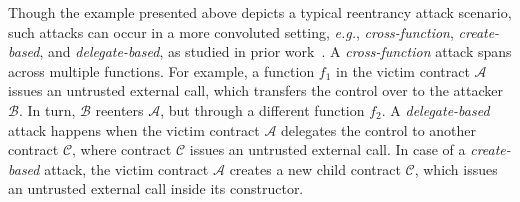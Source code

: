 \documentclass[conference, romanappendices]{tex/IEEEtran}
\theoremstyle{bfnote}
\newcommand{\reentrancy}{{reentrancy}\xspace}
\newcommand{\eg}{\textit{e.g.}}
\begin{document}
Though the example presented above depicts a typical \reentrancy attack scenario, such attacks can occur in a more convoluted setting, \eg, \textit{cross-function}, \textit{create-based}, and \textit{delegate-based}, as studied in prior work~\cite{sereum}.
A \textit{cross-function} attack spans across multiple functions.
For example, a function $f_1$ in the victim contract $\mathcal{A}$ issues an untrusted external call, which transfers the control over to the attacker  $\mathcal{B}$.
In turn, $\mathcal{B}$ reenters $\mathcal{A}$, but through a different function $f_2$.
A \textit{delegate-based} attack happens when the victim contract $\mathcal{A}$ delegates the control to another contract $\mathcal{C}$, where contract $\mathcal{C}$ issues an untrusted external call.
In case of a \textit{create-based} attack, the victim contract $\mathcal{A}$ creates a new child contract $\mathcal{C}$, which issues an untrusted external call inside its constructor.
\end{document}
